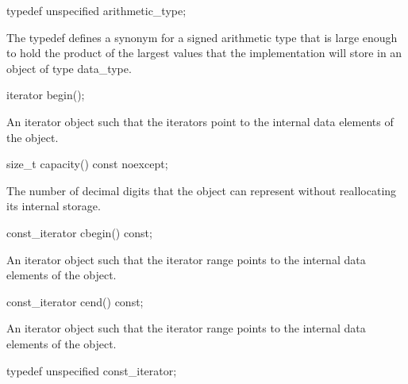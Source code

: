 \begin{addedblock}
\begin{itemdecl}
typedef unspecified arithmetic_type;
\end{itemdecl}

\begin{itemdescr}
The typedef defines a synonym for a signed arithmetic type that is large enough to hold the product of the largest values that the implementation will store in an object of type data_type.
\end{itemdescr}

\begin{itemdecl}
iterator begin();
\end{itemdecl}

\begin{itemdescr}
\returns An iterator object such that the iterators \tcode{[begin(), end())} point to the internal data elements of the  object.
\end{itemdescr}

\begin{itemdecl}
size_t capacity() const noexcept;
\end{itemdecl}

\begin{itemdescr}
\returns The number of decimal digits that the  object can represent without reallocating its internal storage.
\end{itemdescr}

\begin{itemdecl}
const_iterator cbegin() const;
\end{itemdecl}

\begin{itemdescr}
\returns An iterator object such that the iterator range \tcode{[cbegin(), cend())} points to the internal data elements of the  object.
\end{itemdescr}

\begin{itemdecl}
const_iterator cend() const;
\end{itemdecl}

\begin{itemdescr}
\returns An iterator object such that the iterator range \tcode{[cbegin(), cend())} points to the internal data elements of the  object.
\end{itemdescr}

\begin{itemdecl}
typedef unspecified const_iterator;
\end{itemdecl}


\end{addedblock}
